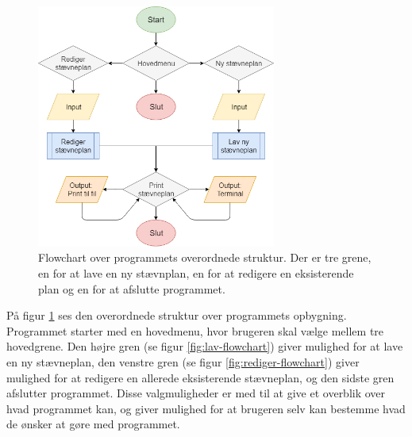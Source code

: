 \begin{figure}[H]
  \centering
  \includegraphics[width=0.7\textwidth]{figures/Overordnet_v2.png}
  \caption{Flowchart over programmets overordnede struktur. Der er tre grene, en for at lave en ny stævnplan, en for at redigere en eksisterende plan og en for at afslutte programmet.}
  \label{fig:overordnet-flowchart}
\end{figure}

På figur \ref{fig:overordnet-flowchart} ses den overordnede struktur over programmets opbygning. Programmet starter med en hovedmenu, hvor brugeren skal vælge mellem tre hovedgrene. Den højre gren (se figur \ref{fig:lav-flowchart}) giver mulighed for at lave en ny stævneplan, den venstre gren (se figur \ref{fig:rediger-flowchart}) giver mulighed for at redigere en allerede eksisterende stævneplan, og den sidste gren afslutter programmet. Disse valgmuligheder er med til at give et overblik over hvad programmet kan, og giver mulighed for at brugeren selv kan bestemme hvad de ønsker at gøre med programmet.

